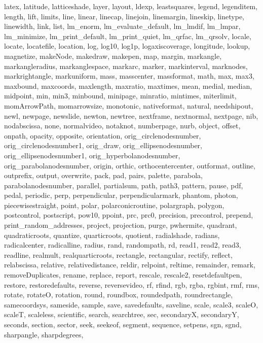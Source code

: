 {{  latex, latitude, latticeshade, layer, layout, ldexp, leastsquares, legend,
  legenditem, length, lift, limits, line, linear, linecap, linejoin,
  linemargin, lineskip, linetype, linewidth, link, list, lm_enorm,
  lm_evaluate_default, lm_lmdif, lm_lmpar, lm_minimize, lm_print_default,
  lm_print_quiet, lm_qrfac, lm_qrsolv, locale, locate, locatefile, location,
  log, log10, log1p, logaxiscoverage, longitude, lookup, magnetize, makeNode,
  makedraw, makepen, map, margin, markangle, markangleradius, markanglespace,
  markarc, marker, markinterval, marknodes, markrightangle, markuniform,
  mass, masscenter, massformat, math, max, max3, maxbound, maxcoords,
  maxlength, maxratio, maxtimes, mean, medial, median, midpoint, min, min3,
  minbound, minipage, minratio, mintimes, miterlimit, momArrowPath,
  momarrowsize, monotonic, nativeformat, natural, needshipout, newl, newpage,
  newslide, newton, newtree, nextframe, nextnormal, nextpage, nib,
  nodabscissa, none, normalvideo, notaknot, numberpage, nurb, object, offset,
  onpath, opacity, opposite, orientation, orig_circlenodesnumber,
  orig_circlenodesnumber1, orig_draw, orig_ellipsenodesnumber,
  orig_ellipsenodesnumber1, orig_hyperbolanodesnumber,
  orig_parabolanodesnumber, origin, orthic, orthocentercenter, outformat,
  outline, outprefix, output, overwrite, pack, pad, pairs, palette, parabola,
  parabolanodesnumber, parallel, partialsum, path, path3, pattern, pause,
  pdf, pedal, periodic, perp, perpendicular, perpendicularmark, phantom,
  photon, piecewisestraight, point, polar, polarconicroutine, polargraph,
  polygon, postcontrol, postscript, pow10, ppoint, prc, prc0, precision,
  precontrol, prepend, print_random_addresses, project, projection, purge,
  pwhermite, quadrant, quadraticroots, quantize, quarticroots, quotient,
  radialshade, radians, radicalcenter, radicalline, radius, rand, randompath,
  rd, read1, read2, read3, readline, realmult, realquarticroots, rectangle,
  rectangular, rectify, reflect, relabscissa, relative, relativedistance,
  reldir, relpoint, reltime, remainder, remark, removeDuplicates, rename,
  replace, report, rescale, rescale2, resetdefaultpen, restore,
  restoredefaults, reverse, reversevideo, rf, rfind, rgb, rgba, rgbint, rmf,
  rms, rotate, rotateO, rotation, round, roundbox, roundedpath,
  roundrectangle, samecoordsys, sameside, sample, save, savedefaults,
  saveline, scale, scale3, scaleO, scaleT, scaleless, scientific, search,
  searchtree, sec, secondaryX, secondaryY, seconds, section, sector, seek,
  seekeof, segment, sequence, setpens, sgn, sgnd, sharpangle, sharpdegrees,
}}
